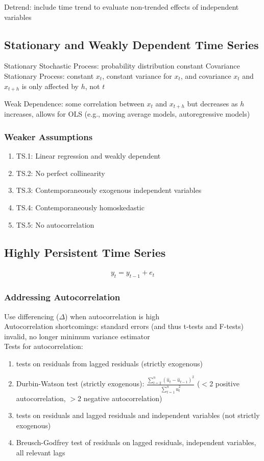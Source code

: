 \documentclass[12pt]{article}
\numberwithin{equation}{section}
\begin{document}
Detrend: include time trend to evaluate non-trended effects of independent variables

\subsection{Stationary and Weakly Dependent Time Series}

Stationary Stochastic Process: probability distribution constant
Covariance Stationary Process: constant $x_t$, constant variance for $x_t$, and covariance $x_t$ and $x_{t+h}$ is only affected by $h$, not $t$

Weak Dependence: some correlation between $x_t$ and $x_{t+h}$ but decreases as $h$ increases, allows for OLS (e.g., moving average models, autoregressive models)

\subsubsection{Weaker Assumptions}
\begin{enumerate}
    \item TS.1: Linear regression and weakly dependent
    \item TS.2: No perfect collinearity
    \item TS.3: Contemporaneously exogenous independent variables
    \item TS.4: Contemporaneously homoskedastic
    \item TS.5: No autocorrelation
\end{enumerate}

\subsection{Highly Persistent Time Series}

\begin{gather}
    y_t = y_{t-1} + e_t
\end{gather}

\subsubsection{Addressing Autocorrelation}
Use differencing ($\Delta$) when autocorrelation is high \\[0.5cm]
Autocorrelation shortcomings: standard errors (and thus t-tests and F-tests) invalid, no longer minimum variance estimator \\[0.5cm]
Tests for autocorrelation:
\begin{enumerate}
    \item tests on residuals from lagged residuals (strictly exogenous)
    \item Durbin-Watson test (strictly exogenous): $\frac{\sum\limits_{t=2}^{n}(\hat{u}_{t}-\hat{u}_{t-1})^2}{\sum\limits_{t=1}^{n}\hat{u}_t^2}$ ($<$2 positive autocorrelation, $>$2 negative autocorrelation)
    \item tests on residuals and lagged residuals and independent variables (not strictly exogenous)
    \item Breusch-Godfrey test of residuals on lagged residuals, independent variables, all relevant lags
\end{enumerate}
\end{document}
